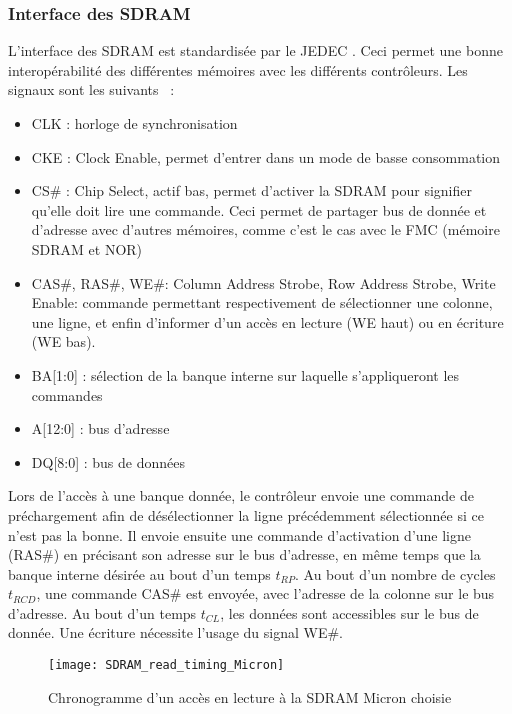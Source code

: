 \subsubsection{Interface des SDRAM}
L'interface des SDRAM est standardisée par le JEDEC \autocite{JEDEC}.
Ceci permet une bonne interopérabilité des différentes mémoires avec les différents contrôleurs.
Les signaux sont les suivants \autocite{micron:MT48LC32M8A2P7E}~:
\begin{itemize}
	\item CLK : horloge de synchronisation
	\item CKE : Clock Enable, permet d'entrer dans un mode de basse consommation
	\item CS\# : Chip Select, actif bas, permet d'activer la SDRAM pour signifier qu'elle doit lire une commande. Ceci permet de partager bus de donnée et d'adresse avec d'autres mémoires, comme c'est le cas avec le \gls{FMC} (mémoire SDRAM et NOR)
	\item CAS\#, RAS\#, WE\#: Column Address Strobe, Row Address Strobe, Write Enable: commande permettant respectivement de sélectionner une colonne, une ligne, et enfin d'informer d'un accès en lecture (WE haut) ou en écriture (WE bas).
	\item BA[1:0] : sélection de la banque interne sur laquelle s'appliqueront les commandes
	\item A[12:0] : bus d'adresse
	\item DQ[8:0] : bus de données                
\end{itemize}

Lors de l'accès à une banque donnée, le contrôleur envoie une commande de préchargement afin de désélectionner la ligne précédemment sélectionnée si ce n'est pas la bonne.
Il envoie ensuite une commande d'activation d'une ligne (RAS\#) en précisant son adresse sur le bus d'adresse, en même temps que la banque interne désirée au bout d'un temps $t_{RP}$.
Au bout d'un nombre de cycles $t_{RCD}$, une commande CAS\# est envoyée, avec l'adresse de la colonne sur le bus d'adresse.
Au bout d'un temps $t_{CL}$, les données sont accessibles sur le bus de donnée.
Une écriture nécessite l'usage du signal WE\#.
		
\begin{figure}[H]
	\begin{center}
		\texttt{[image: SDRAM\_read\_timing\_Micron]}
	\end{center}
	\caption{Chronogramme d'un accès en lecture à la SDRAM Micron choisie \autocite{micron:MT48LC32M8A2P7E}}
\end{figure}
        

